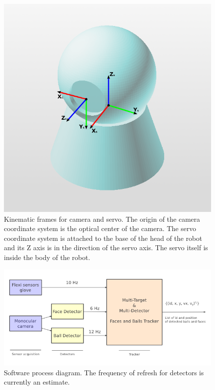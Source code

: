 \documentclass[a4paper]{article}
\begin{document}
  \begin{figure}[ht]
    \centering
    \includegraphics[scale=0.6]{RobocamWithAxes}
    \caption{Kinematic frames for camera and servo. The origin of the camera coordinate system is the optical center of the camera. The servo coordinate system is attached to the base of the head of the robot and its Z axis is in the direction of the servo axis. The servo itself is inside the body of the robot.}
    \label{fig:kinematics1}
  \end{figure}

  \begin{figure}[ht]
    \centering
    \includegraphics[scale=0.7]{RobocamSoftwareProcess}
    \caption{Software process diagram. The frequency of refresh for detectors is currently an estimate.}
    \label{fig:process1}
  \end{figure}
\end{document}
